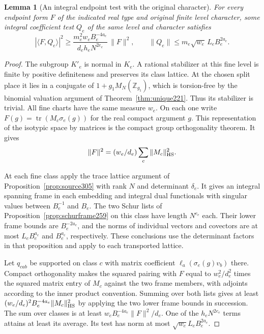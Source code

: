 \documentclass[a4paper,11pt]{article}
\newtheorem{lemma}[proposition]{Lemma}
\theoremstyle{definition}
\theoremstyle{remark}
\newcommand{\ZZ}{\mathbb Z}\newcommand{\ord}{\operatorname{ord}}
\numberwithin{equation}{section}
\begin{document}
\begin{lemma}[An integral endpoint test with the original character]\leavevmode
\label{lem:endpoint305}
For every endpoint form \(F\) of the indicated real type
and original finite level character, some integral
coefficient test \(Q_e\) of the same level and character
satisfies
\[
 |\langle F,Q_e\rangle|^2
    \ge \frac{m_e^2 w_e B_e^{-4a_e}}
                {d_e h_e N^{2e_e}}\,\|F\|^2,\qquad
 \|Q_e\|\le m_e\sqrt{w_e}\,L_e B_e^{2a_e}.
\]
\end{lemma}
\begin{proof}
The subgroup \(K'_e\) is normal in \(K_e\). A rational
stabilizer at this fine level is finite by positive
definiteness and preserves its class lattice. At the
chosen split place it lies in a conjugate of
\(1+g_1 M_N(\ZZ_{g_1})\), which is torsion-free by the
binomial valuation argument of Theorem~\ref{thm:unique221}.
Thus its stabilizer is trivial. All fine charts have the
same measure \(w_e\). On each one write
\(F(g)=\operatorname{tr}(M_c\sigma_e(g))\) for the real
compact argument \(g\). This representation of the
isotypic space by matrices is the compact group
orthogonality theorem. It gives
\[
                       \|F\|^2=(w_e/d_e)\sum_c\|M_c\|_{\rm HS}^2 .
\]

At each fine class apply the trace lattice argument of
Proposition~\ref{prop:source305} with rank \(N\) and determinant
\(\delta_e\). It gives an integral spanning frame in each
embedding and integral dual functionals with singular values
between \(B_e^{-1}\) and \(B_e\). The two Schur lists
of Proposition~\ref{prop:schurframe259} on this class have
length \(N^{e_e}\) each. Their lower frame bounds are
\(B_e^{-2a_e}\), and the norms of individual vectors
and covectors are at most \(L_eB_e^{a_e}\) and \(B_e^{a_e}\),
respectively. These conclusions use the determinant factors
in that proposition and apply to each transported lattice.

Let \(q_{cab}\) be supported on class \(c\) with matrix
coefficient \(\ell_a(\sigma_e(g)v_b)\) there. Compact
orthogonality makes the squared pairing with \(F\) equal
to \(w_e^2/d_e^2\) times the squared matrix entry of
\(M_c\) against the two frame members, with adjoints
according to the inner product convention. Summing over
both lists gives at least
\((w_e/d_e)^2 B_e^{-4a_e}\|M_c\|_{\rm HS}^2\) by applying
the two lower frame bounds in succession. The sum over
classes is at least \(w_e B_e^{-4a_e}\|F\|^2/d_e\).
One of the \(h_e N^{2e_e}\) terms attains at least its
average. Its test has norm at most
\(\sqrt{w_e}L_eB_e^{2a_e}\).


\end{proof}
\end{document}
